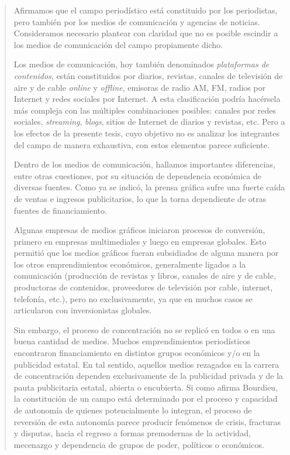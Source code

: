 \begin{quote}
Afirmamos que el campo periodístico está constituido por los periodistas, pero también por los medios de comunicación y agencias de noticias. Consideramos necesario plantear con claridad que no es posible escindir a los medios de comunicación del campo propiamente dicho.

Los medios de comunicación, hoy también denominados \emph{plataformas de contenidos}, están constituidos por diarios, revistas, canales de televisión de aire y de cable \emph{online} y \emph{offline}, emisoras de radio AM, FM, radios por Internet y redes sociales por Internet. A esta clasificación podría hacérsela más compleja con las múltiples combinaciones posibles: canales por redes sociales, \emph{streaming}, \emph{blogs}, sitios de Internet de diarios y revistas, etc. Pero a los efectos de la presente tesis, cuyo objetivo no es analizar los integrantes del campo de manera exhaustiva, con estos elementos parece suficiente.

Dentro de los medios de comunicación, hallamos importantes diferencias, entre otras cuestiones, por su situación de dependencia económica de diversas fuentes. Como ya se indicó, la prensa gráfica sufre una fuerte caída de ventas e ingresos publicitarios, lo que la torna dependiente de otras fuentes de financiamiento.

Algunas empresas de medios gráficos iniciaron procesos de conversión, primero en empresas multimediales y luego en empresas globales. Esto permitió que los medios gráficos fueran subsidiados de alguna manera por los otros emprendimientos económicos, generalmente ligados a la comunicación (producción de revistas y libros, canales de aire y de cable, productoras de contenidos, proveedores de televisión por cable, internet, telefonía, etc.), pero no exclusivamente, ya que en muchos casos se articularon con inversionistas globales.

Sin embargo, el proceso de concentración no se replicó en todos o en una buena cantidad de medios. Muchos emprendimientos periodísticos encontraron financiamiento en distintos grupos económicos y/o en la publicidad estatal. En tal sentido, aquellos medios rezagados en la carrera de concentración dependen exclusivamente de la publicidad privada y de la pauta publicitaria estatal, abierta o encubierta. Si como afirma Bourdieu, la constitución de un campo está determinado por el proceso y capacidad de autonomía de quienes potencialmente lo integran, el proceso de reversión de esta autonomía parece producir fenómenos de crisis, fracturas y disputas, hacia el regreso a formas premodernas de la actividad, mecenazgo y dependencia de grupos de poder, políticos o económicos.


\end{quote}
